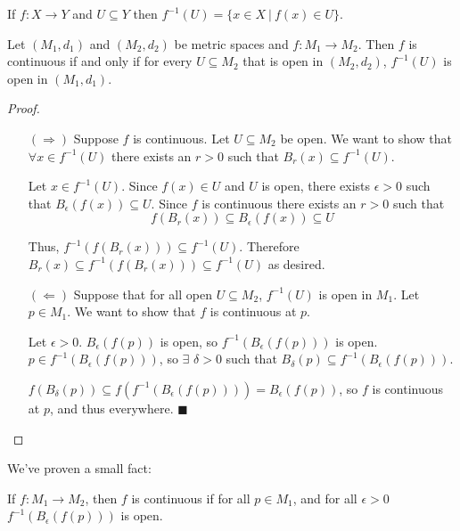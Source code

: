 \begin{definition}
	If $f:X \to Y$ and $U \subseteq Y$ then $f^{-1} (U) = \{x\in X\ |\ f(x) \in U\}$. 
\end{definition}
\begin{theorem}
	Let $(M_1, d_1)$ and $(M_2, d_2)$ be metric spaces and $f: M_1 \to M_2$. Then $f$ is continuous if and only if for every $U \subseteq M_2$ that is open in $(M_2, d_2)$, $f^{-1} (U)$ is open in $(M_1, d_1)$. 
\end{theorem}
\begin{proof}
	\begin{itemize}
		\item[$(\Rightarrow)$] Suppose $f$ is continuous. Let $U \subseteq M_2$ be open. We want to show that $\forall x \in f^{-1} (U)$ there exists an $r>0$ such that $B_r (x) \subseteq f^{-1} (U)$.
		
		Let $x\in f^{-1} (U)$. Since $f(x)\in U$ and $U$ is open, there exists $\epsilon >0$ such that $B_\epsilon (f(x)) \subseteq U$. Since $f$ is continuous there exists an $r>0$ such that
		\[f(B_r (x)) \subseteq B_\epsilon (f(x)) \subseteq U\]
		
		Thus, $f^{-1} (f(B_r (x))) \subseteq f^{-1} (U)$. Therefore $B_r (x) \subseteq f^{-1} (f(B_r (x))) \subseteq f^{-1} (U)$ as desired.
		
		\item[$(\Leftarrow)$] Suppose that for all open $U\subseteq M_{2}$, $f^{-1}(U)$ is open in $M_{1}$. Let $p \in M_{1}$. We want to show that $f$ is continuous at $p$.
		
		Let $\epsilon > 0$. $B_{\epsilon}(f(p))$ is open, so $f^{-1}(B_{\epsilon}(f(p)))$ is open. $p\in f^{-1}(B_{\epsilon}(f(p)))$, so $\exists$ $\delta>0$ such that $B_{\delta}(p)\subseteq f^{-1}(B_{\epsilon}(f(p)))$.
		
		$f(B_{\delta}(p))\subseteq f(f^{-1}(B_{\epsilon}(f(p))))=B_{\epsilon}(f(p))$, so $f$ is continuous at $p$, and thus everywhere. $\blacksquare$ 
	\end{itemize}
\end{proof}

We've proven a small fact: 
\begin{smallfact}
	If $f : M_{1} \rightarrow M_{2}$, then $f$ is continuous if for all $p\in M_{1}$, and for all $\epsilon>0$ $f^{-1}(B_{\epsilon}(f(p)))$ is open. 
\end{smallfact}
